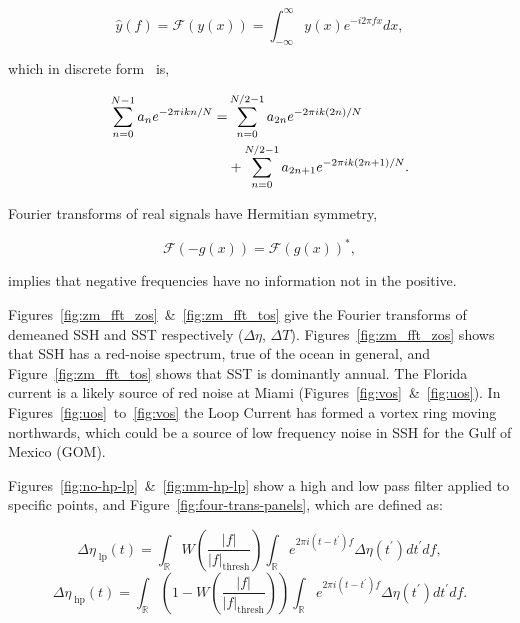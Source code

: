 \begin{equation}
\hat{y}(f) =  \mathcal{F}(y(x))=\int_{-\infty}^{\infty} y(x) e^{-i 2\pi f x} d x,
\end{equation}

which in discrete form~\cite{cooley1965algorithm} is,


\begin{eqnarray}
\sum_{n=0}^{N-1} a_{n} e^{-2 \pi i  k n/ N}=&\sum_{n=0}^{N / 2-1} a_{2 n}
e^{-2 \pi i k (2 n)/ N}  \\ &+\sum_{n=0}^{N / 2-1} a_{2n+1} e^{-2 \pi i k (2 n+1)/ N}. \notag
\end{eqnarray}

Fourier transforms of real signals have Hermitian symmetry,

\begin{equation}
\mathcal{F}{(-g(x))}=\mathcal{F}(g(x))^{*},
\end{equation}

implies that negative frequencies have no information not in the positive.


Figures~\ref{fig:zm_fft_zos}~\&~\ref{fig:zm_fft_tos} give the
Fourier transforms of demeaned SSH and SST respectively ($\Delta \eta$, $\Delta T$).
Figures~\ref{fig:zm_fft_zos} shows that SSH has a red-noise spectrum,
 true of the ocean in general, and Figure~\ref{fig:zm_fft_tos}
shows that SST is dominantly annual.
The Florida current is a likely source of red noise at Miami
(Figures~\ref{fig:vos}~\&~\ref{fig:uos}).
In Figures~\ref{fig:uos}~to~\ref{fig:vos}
the Loop Current has formed a vortex ring moving northwards,
which could be a source of low frequency
noise in SSH for the Gulf of Mexico (GOM).

Figures~\ref{fig:no-hp-lp}~\&~\ref{fig:mm-hp-lp} show a high and
low pass filter applied to specific points, and Figure~\ref{fig:four-trans-panels},
which are defined as:

\begin{equation}
\Delta\eta_{\;\mathrm{lp}}(t) = \int_{\mathbb{R}}W\left(\frac{|f|}
{|f|_{\mathrm{thresh}}}\right)\int_{\mathbb{R}}e^{2\pi i (t-t^{\prime})f }
\Delta \eta(t^{\prime})dt^{\prime}df,
\end{equation}
\begin{equation}
\Delta\eta_{\;\mathrm{hp}}(t) = \int_{\mathbb{R}}\left(1-W\left(\frac{|f|}
{|f|_{\mathrm{thresh}}}\right)\right)\int_{\mathbb{R}}e^{2\pi i (t-t^{\prime})f}
   \Delta \eta(t^{\prime})dt^{\prime}df.
\end{equation}

